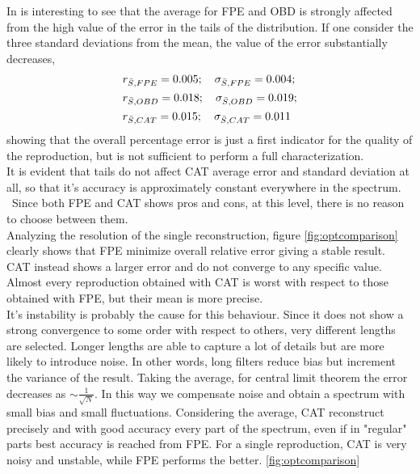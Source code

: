 \documentclass[twocolumn,showpacs,preprintnumbers,nofootinbib,prd,
superscriptaddress,10pt]{revtex4-1}
\begin{document}
In is interesting to see that the average for FPE and OBD is strongly affected from the high value of the error in the tails of the distribution. If one consider the three standard deviations from the mean, the value of the error substantially decreases, 
\begin{align*}
\centering
&r_{\bar S, FPE} = 0.005; \quad \sigma_{\bar S, FPE} = 0.004;  \\
&r_{\bar S, OBD} = 0.018;\quad \sigma_{\bar S, OBD} = 0.019 ; \\ 
&r_{\bar S, CAT} = 0.015; \quad \sigma_{\bar S, CAT} = 0.011
\end{align*}
showing that the overall percentage error is just a first indicator for the quality of the reproduction, but is not sufficient to perform a full characterization. \\
It is evident that tails do not affect CAT  average error and standard deviation at all, so that it's accuracy is approximately constant everywhere in the spectrum. \\ \ 
Since both FPE and CAT shows pros and cons, at this level, there is no reason to choose between them.\\ 
Analyzing the resolution of the single reconstruction, figure \ref{fig:optcomparison} clearly shows that FPE minimize overall relative error giving a stable result.\\ 
CAT instead shows a larger error and do not converge to any specific value. Almost every reproduction obtained with CAT is worst with respect to those obtained with FPE, but their mean is more precise. \\ 
It's instability is probably the cause for this behaviour. Since it does not show a strong convergence to some order with respect to others, very different lengths are selected.
Longer lengths are able to capture a lot of details but are more likely to introduce noise. In other words, long filters reduce bias but increment the variance of the result. 
Taking the average, for central limit theorem the error decreases as $\sim \frac{1}{\sqrt{N}}$. In this way we compensate noise and obtain a spectrum with small bias and small fluctuations.
Considering the average, CAT reconstruct precisely and with good accuracy every part of the spectrum, even if in "regular" parts best accuracy is reached from FPE. For a single reproduction, CAT is very noisy and unstable, while FPE performs the better. \ref{fig:optcomparison}
\end{document}
